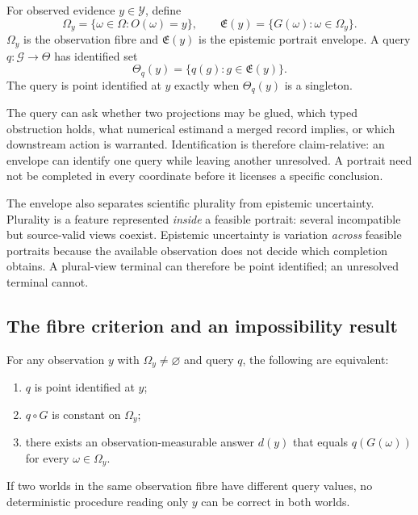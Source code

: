 \begin{definition}
For observed evidence $y\in\mathcal Y$, define
\begin{equation}
  \Omega_y=\{\omega\in\Omega:O(\omega)=y\},\qquad
  \mathfrak E(y)=\{G(\omega):\omega\in\Omega_y\}.
\end{equation}
$\Omega_y$ is the observation fibre and $\mathfrak E(y)$ is the epistemic
portrait envelope. A query $q:\mathcal G\to\Theta$ has identified set
\begin{equation}
  \Theta_q(y)=\{q(g):g\in\mathfrak E(y)\}.
\end{equation}
The query is point identified at $y$ exactly when $\Theta_q(y)$ is a
singleton.
\end{definition}

The query can ask whether two projections may be glued, which typed
obstruction holds, what numerical estimand a merged record implies, or which
downstream action is warranted. Identification is therefore claim-relative:
an envelope can identify one query while leaving another unresolved. A
portrait need not be completed in every coordinate before it licenses a
specific conclusion.

The envelope also separates scientific plurality from epistemic uncertainty.
Plurality is a feature represented \emph{inside} a feasible portrait: several
incompatible but source-valid views coexist. Epistemic uncertainty is
variation \emph{across} feasible portraits because the available observation
does not decide which completion obtains. A plural-view terminal can therefore
be point identified; an unresolved terminal cannot.

\subsection{The fibre criterion and an impossibility result}

\begin{theorem}
\label{thm:fibre}
For any observation $y$ with $\Omega_y\neq\varnothing$ and query $q$, the
following are equivalent:
\begin{enumerate}
  \item $q$ is point identified at $y$;
  \item $q\circ G$ is constant on $\Omega_y$;
  \item there exists an observation-measurable answer $d(y)$ that equals
        $q(G(\omega))$ for every $\omega\in\Omega_y$.
\end{enumerate}
If two worlds in the same observation fibre have different query values, no
deterministic procedure reading only $y$ can be correct in both worlds.
\end{theorem}

